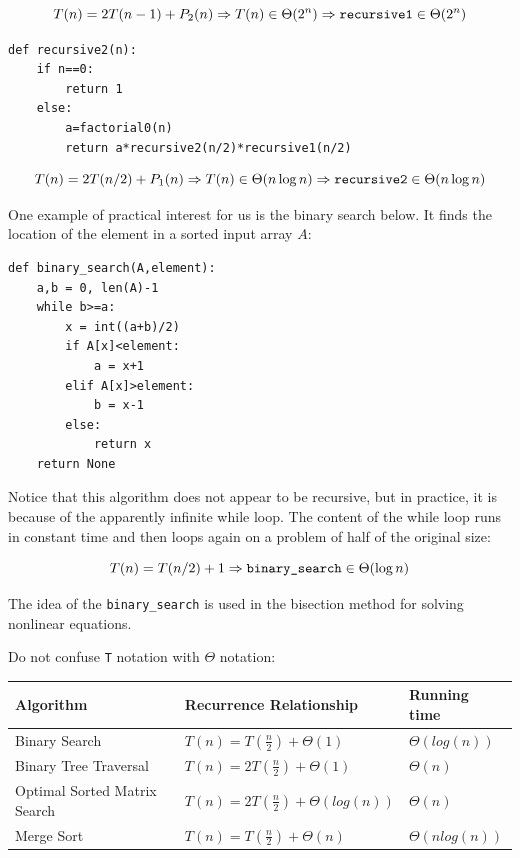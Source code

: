 \documentclass[justified,sixbynine]{tufte-book}
\def\ft{\small\tt}
\theoremstyle{plain}%
\theoremstyle{definition}
\theoremstyle{remark}
\begin{document}
\begin{fullwidth}
\begin{equation}
T(n)=2T(n-1)+P_2(n)\Rightarrow T(n)\in \Theta (2^n)\Rightarrow \text{{\tt %
recursive1}}\in \Theta (2^n)
\end{equation}

\begin{lstlisting}
def recursive2(n):
    if n==0:
        return 1
    else:
        a=factorial0(n)
        return a*recursive2(n/2)*recursive1(n/2)
\end{lstlisting}

\begin{equation}
T(n)=2T(n/2)+P_1(n)\Rightarrow T(n)\in \Theta (n\log n)\Rightarrow \text{%
{\tt recursive2}}\in \Theta (n\log n)
\end{equation}

One example of practical interest for us is the binary search below. It finds the location of the element in a sorted input array $A$:

\begin{lstlisting}
def binary_search(A,element):
    a,b = 0, len(A)-1
    while b>=a:
        x = int((a+b)/2)
        if A[x]<element:
            a = x+1
        elif A[x]>element:
            b = x-1
        else:
            return x
    return None
\end{lstlisting}

Notice that this algorithm does not appear to be recursive, but in practice, it is because of the apparently infinite while loop. The content of the while loop runs in constant time and then loops again on a problem of half of the original size:

\begin{equation}
T(n)=T(n/2)+1\Rightarrow \text{{\tt binary\_search}}\in \Theta(\log n)
\end{equation}

The idea of the {\ft binary\_search} is used in the bisection method for solving nonlinear equations.

Do not confuse {\ft T} notation with $\Theta$ notation:

\begin{table}
\begin{tabular}{|l|l|l|}\hline
Algorithm & Recurrence Relationship & Running time \\ \hline
Binary Search & $T(n) = T(\frac n 2) + \Theta (1)$ & $\Theta(log(n))$ \\ \hline
Binary Tree Traversal & $T(n) = 2T(\frac n 2) + \Theta (1)$ & $\Theta(n)$ \\ \hline
Optimal Sorted Matrix Search & $T(n) = 2T(\frac n 2) + \Theta (log(n))$ & $\Theta(n)$ \\ \hline
Merge Sort & $T(n) = T(\frac n 2) + \Theta (n)$ & $\Theta(n log(n))$ \\ \hline
\end{tabular}
\label{table1}
\end{table}


\end{fullwidth}
\end{document}
